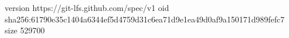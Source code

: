 version https://git-lfs.github.com/spec/v1
oid sha256:61790e35c1404a6344ef5d4759d31c6ea71d9e1ea49d0af9a150171d989fefc7
size 529700
